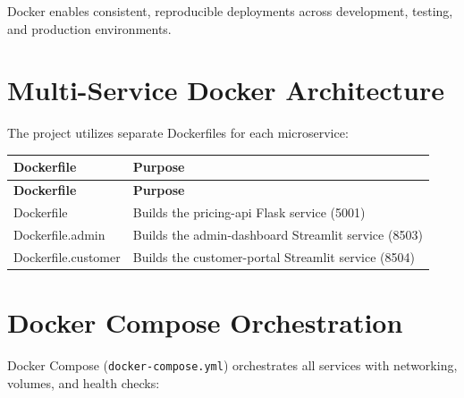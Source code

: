 \documentclass[12pt,a4paper]{report}
\begin{document}
Docker enables consistent, reproducible deployments across development, testing, and production environments.

\section{Multi-Service Docker Architecture}

The project utilizes separate Dockerfiles for each microservice:

\begin{longtable}{L{2.5cm} L{8cm}}
    \toprule
    \textbf{Dockerfile} & \textbf{Purpose} \\
    \midrule
    \endfirsthead
    \toprule
    \textbf{Dockerfile} & \textbf{Purpose} \\
    \midrule
    \endhead
    \bottomrule
    \endfoot
    Dockerfile & Builds the pricing-api Flask service (5001) \\[4pt]
    Dockerfile.admin & Builds the admin-dashboard Streamlit service (8503) \\[4pt]
    Dockerfile.customer & Builds the customer-portal Streamlit service (8504) \\[4pt]
\end{longtable}

\section{Docker Compose Orchestration}

Docker Compose (\texttt{docker-compose.yml}) orchestrates all services with networking, volumes, and health checks:
\end{document}
